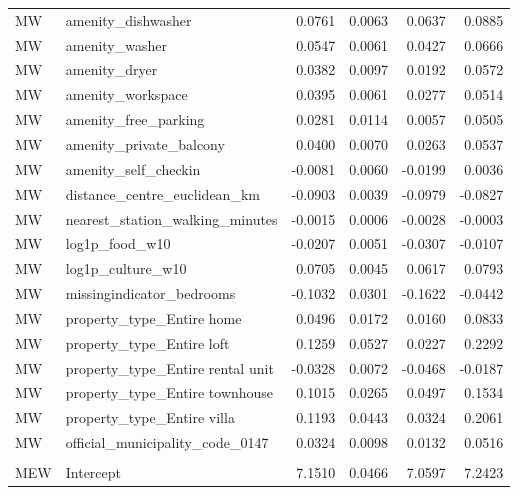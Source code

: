 \begin{landscape}
\begin{longtable}{>{\raggedright\arraybackslash}p{2cm}>{\raggedright\arraybackslash}p{9cm}rrrr}
MW & amenity\_\allowbreak{}dishwasher & 0.0761 & 0.0063 & 0.0637 & 0.0885 \\
MW & amenity\_\allowbreak{}washer & 0.0547 & 0.0061 & 0.0427 & 0.0666 \\
MW & amenity\_\allowbreak{}dryer & 0.0382 & 0.0097 & 0.0192 & 0.0572 \\
MW & amenity\_\allowbreak{}workspace & 0.0395 & 0.0061 & 0.0277 & 0.0514 \\
MW & amenity\_\allowbreak{}free\_\allowbreak{}parking & 0.0281 & 0.0114 & 0.0057 & 0.0505 \\
MW & amenity\_\allowbreak{}private\_\allowbreak{}balcony & 0.0400 & 0.0070 & 0.0263 & 0.0537 \\
MW & amenity\_\allowbreak{}self\_\allowbreak{}checkin & -0.0081 & 0.0060 & -0.0199 & 0.0036 \\
MW & distance\_\allowbreak{}centre\_\allowbreak{}euclidean\_\allowbreak{}km & -0.0903 & 0.0039 & -0.0979 & -0.0827 \\
MW & nearest\_\allowbreak{}station\_\allowbreak{}walking\_\allowbreak{}minutes & -0.0015 & 0.0006 & -0.0028 & -0.0003 \\
MW & log1p\_\allowbreak{}food\_\allowbreak{}w10 & -0.0207 & 0.0051 & -0.0307 & -0.0107 \\
MW & log1p\_\allowbreak{}culture\_\allowbreak{}w10 & 0.0705 & 0.0045 & 0.0617 & 0.0793 \\
MW & missingindicator\_\allowbreak{}bedrooms & -0.1032 & 0.0301 & -0.1622 & -0.0442 \\
MW & property\_\allowbreak{}type\_\allowbreak{}Entire home & 0.0496 & 0.0172 & 0.0160 & 0.0833 \\
MW & property\_\allowbreak{}type\_\allowbreak{}Entire loft & 0.1259 & 0.0527 & 0.0227 & 0.2292 \\
MW & property\_\allowbreak{}type\_\allowbreak{}Entire rental unit & -0.0328 & 0.0072 & -0.0468 & -0.0187 \\
MW & property\_\allowbreak{}type\_\allowbreak{}Entire townhouse & 0.1015 & 0.0265 & 0.0497 & 0.1534 \\
MW & property\_\allowbreak{}type\_\allowbreak{}Entire villa & 0.1193 & 0.0443 & 0.0324 & 0.2061 \\
MW & official\_\allowbreak{}municipality\_\allowbreak{}code\_\allowbreak{}0147 & 0.0324 & 0.0098 & 0.0132 & 0.0516 \\
\addlinespace[0.5em]
\multicolumn{6}{l}{\textbf{MEW}} \\
MEW & Intercept & 7.1510 & 0.0466 & 7.0597 & 7.2423 \\

\end{longtable}
\end{landscape}
